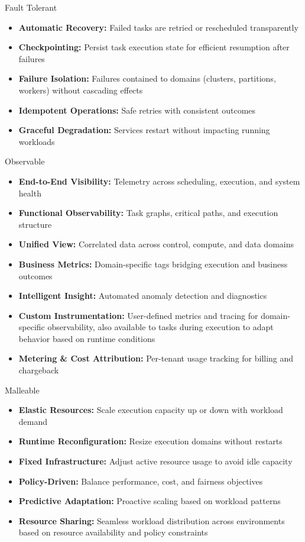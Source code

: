 \begin{frame}{Fault Tolerant}
	\note
	{
		\begin{itemize}
			\item \textbf{Automatic Recovery:} Failed tasks are retried or rescheduled transparently
			\item \textbf{Checkpointing:} Persist task execution state for efficient resumption after failures
			\item \textbf{Failure Isolation:} Failures contained to domains (clusters, partitions, workers) without cascading effects
			\item \textbf{Idempotent Operations:} Safe retries with consistent outcomes
			\item \textbf{Graceful Degradation:} Services restart without impacting running workloads
		\end{itemize}
	}

\end{frame}

\begin{frame}{Observable}
	\begin{itemize}
		\item \textbf{End-to-End Visibility:} Telemetry across scheduling, execution, and system health
		\item \textbf{Functional Observability:} Task graphs, critical paths, and execution structure
		\item \textbf{Unified View:} Correlated data across control, compute, and data domains
		\item \textbf{Business Metrics:} Domain-specific tags bridging execution and business outcomes
		\item \textbf{Intelligent Insight:} Automated anomaly detection and diagnostics
		\item \textbf{Custom Instrumentation:} User-defined metrics and tracing for domain-specific observability, also available to tasks during execution to adapt behavior based on runtime conditions
		\item \textbf{Metering \& Cost Attribution:} Per-tenant usage tracking for billing and chargeback
	\end{itemize}
\end{frame}

\begin{frame}{Malleable}
	\begin{itemize}
		\item \textbf{Elastic Resources:} Scale execution capacity up or down with workload demand
		\item \textbf{Runtime Reconfiguration:} Resize execution domains without restarts
		\item \textbf{Fixed Infrastructure:} Adjust active resource usage to avoid idle capacity
		\item \textbf{Policy-Driven:} Balance performance, cost, and fairness objectives
		\item \textbf{Predictive Adaptation:} Proactive scaling based on workload patterns
		\item \textbf{Resource Sharing:} Seamless workload distribution across environments based on resource availability and policy constraints
	\end{itemize}
\end{frame}

